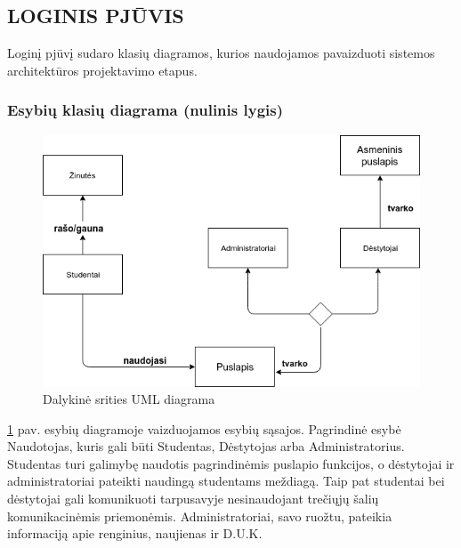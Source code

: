 \documentclass{VUMIFPSkursinis}
\begin{document}
\subsection{LOGINIS PJŪVIS}
Loginį pjūvį sudaro klasių diagramos, kurios naudojamos pavaizduoti sistemos architektūros projektavimo etapus.
\subsubsection{Esybių klasių diagrama (nulinis lygis)}
\begin{figure}[H]
	\centering
	\includegraphics[width=\linewidth]{img/dalykine.png}
	\caption{Dalykinė srities UML diagrama}
	\label{fig:dalykine}
\end{figure}
\ref{fig:dalykine} pav. esybių diagramoje vaizduojamos esybių sąsajos. Pagrindinė esybė Naudotojas,
kuris gali būti Studentas, Dėstytojas arba Administratorius. Studentas turi galimybę naudotis pagrindinėmis puslapio funkcijos, o dėstytojai ir administratoriai pateikti naudingą studentams meždiagą. Taip pat studentai bei dėstytojai gali komunikuoti tarpusavyje nesinaudojant trečiųjų šalių komunikacinėmis priemonėmis. Administratoriai, savo ruožtu, pateikia informaciją apie renginius, naujienas ir D.U.K.
\end{document}
